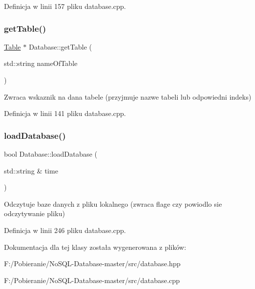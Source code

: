Definicja w linii 157 pliku database.\+cpp.

\mbox{\label{class_database_a3e26371207ec61140b3853e606577d57}} 
\subsubsection{\texorpdfstring{get\+Table()}{getTable()}}
{\footnotesize\ttfamily \mbox{\hyperlink{class_table}{Table}} $\ast$ Database\+::get\+Table (\begin{DoxyParamCaption}\item[{std\+::string}]{name\+Of\+Table }\end{DoxyParamCaption})}

Zwraca wskaznik na dana tabele (przyjmuje nazwe tabeli lub odpowiedni indeks) 

Definicja w linii 141 pliku database.\+cpp.

\mbox{\label{class_database_a8ce06beb2fbd98398e0309e55a093508}} 
\subsubsection{\texorpdfstring{load\+Database()}{loadDatabase()}}
{\footnotesize\ttfamily bool Database\+::load\+Database (\begin{DoxyParamCaption}\item[{std\+::string \&}]{time }\end{DoxyParamCaption})}

Odczytuje baze danych z pliku lokalnego (zwraca flage czy powiodlo sie odczytywanie pliku) 

Definicja w linii 246 pliku database.\+cpp.



Dokumentacja dla tej klasy została wygenerowana z plików\+:\begin{DoxyCompactItemize}
\item 
F\+:/\+Pobieranie/\+No\+S\+Q\+L-\/\+Database-\/master/src/database.\+hpp\item 
F\+:/\+Pobieranie/\+No\+S\+Q\+L-\/\+Database-\/master/src/database.\+cpp\end{DoxyCompactItemize}
